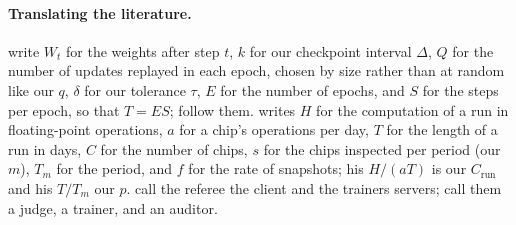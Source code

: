 \begin{refsection}
\paragraph{Translating the literature.} \Textcite{JiaEtAl2021} write $W_t$ for the weights after step $t$, $k$ for our checkpoint interval $\Delta$, $Q$ for the number of updates replayed in each epoch, chosen by size rather than at random like our $q$, $\delta$ for our tolerance $\tau$, $E$ for the number of epochs, and $S$ for the steps per epoch, so that $T=ES$; \textcite{FangEtAl2023} follow them. \Textcite{Shavit2023} writes $H$ for the computation of a run in floating-point operations, $a$ for a chip's operations per day, $T$ for the length of a run in days, $C$ for the number of chips, $s$ for the chips inspected per period (our $m$), $T_m$ for the period, and $f$ for the rate of snapshots; his $H/(aT)$ is our $C_{\mathrm{run}}$ and his $T/T_m$ our $p$. \Textcite{CanettiRivaRothblum2011} call the referee the client and the trainers servers; \textcite{SrivastavaAroraBoneh2024} call them a judge, a trainer, and an auditor.

\printchapterbib
\end{refsection}

